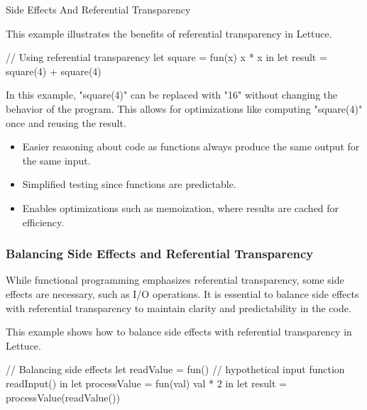 \begin{notes}{Side Effects And Referential Transparency}
\begin{highlight}
        This example illustrates the benefits of referential transparency in Lettuce.
    
    \begin{code}[Lettuce]
    // Using referential transparency
    let square = fun(x) {
        x * x
    } in
    let result = square(4) + square(4)
    \end{code}
    
        In this example, "square(4)" can be replaced with "16" without changing the behavior of the program. This allows for optimizations like computing "square(4)" once and reusing the result.
    
        \begin{itemize}
            \item Easier reasoning about code as functions always produce the same output for the same input.
            \item Simplified testing since functions are predictable.
            \item Enables optimizations such as memoization, where results are cached for efficiency.
        \end{itemize}
    
    \end{highlight}
    
    \subsubsection*{Balancing Side Effects and Referential Transparency}
    
    While functional programming emphasizes referential transparency, some side effects are necessary, such as I/O operations. It is essential to balance side effects with referential transparency 
    to maintain clarity and predictability in the code.
    
    \begin{highlight}
    
        This example shows how to balance side effects with referential transparency in Lettuce.
    
    \begin{code}[Lettuce]
    // Balancing side effects
    let readValue = fun() {
        // hypothetical input function
        readInput()
    } in
    let processValue = fun(val) {
        val * 2
    } in
    let result = processValue(readValue())
    \end{code}
    

\end{highlight}
\end{notes}
